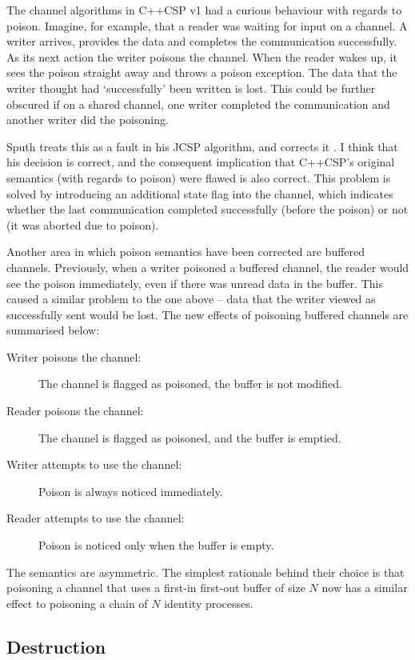 \documentclass[12pt]{IOS-Book-Article-CPA-2007}
\begin{document}
The channel algorithms in C++CSP v1 had a curious behaviour with regards to poison.  Imagine, for example, that a reader was waiting for input 
on a channel.  A writer arrives, provides the data and completes the communication successfully.  As its next action the writer poisons the channel.  
When the reader wakes up, it sees the poison straight away and throws a poison exception.  The data that the writer thought had `successfully' been written 
is lost.  This could be further obscured if on a shared channel, one writer completed the communication and another writer did the poisoning.

Sputh treats this as a fault in his JCSP algorithm, and corrects it \cite{sputh-phd-thesis}.  I think that his decision is correct, and the 
consequent implication that C++CSP's original semantics (with regards to poison) were flawed is also correct.  This problem is solved by introducing 
an additional state flag into the channel, which indicates whether the last communication completed successfully (before the poison) or not (it was 
aborted due to poison).

Another area in which poison semantics have been corrected are buffered channels.  Previously, when a writer poisoned a buffered channel, the reader would see 
the poison immediately, even if there was unread data in the buffer.  This caused a similar problem to the one above -- data that the writer viewed as 
successfully sent would be lost.  The new effects of poisoning buffered channels are summarised below:

\begin{description}
\item[Writer poisons the channel:] The channel is flagged as poisoned, the buffer is not modified.
\item[Reader poisons the channel:] The channel is flagged as poisoned, and the buffer is emptied.
\item[Writer attempts to use the channel:] Poison is always noticed immediately.
\item[Reader attempts to use the channel:] Poison is noticed only when the buffer is empty.
\end{description}

The semantics are asymmetric.  The simplest rationale behind their choice is that poisoning a channel that uses a first-in 
first-out buffer of size $N$ now has a similar effect to poisoning a chain of $N$ identity processes.  

\subsection{Destruction}
\end{document}
